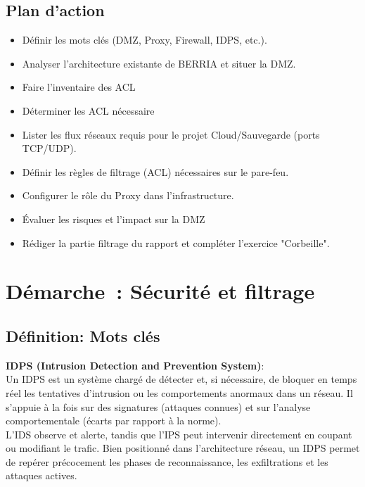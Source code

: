 \newpage

\subsection*{Plan d'action}
{}
\begin{itemize}
  \item Définir les mots clés (DMZ, Proxy, Firewall, IDPS, etc.).
  \item Analyser l'architecture existante de BERRIA et situer la DMZ.
  \item Faire l’inventaire des ACL
  \item Déterminer les ACL nécessaire
  \item Lister les flux réseaux requis pour le projet Cloud/Sauvegarde (ports TCP/UDP).
  \item Définir les règles de filtrage (ACL) nécessaires sur le pare-feu.
  \item Configurer le rôle du Proxy dans l'infrastructure.
  \item Évaluer les risques et l’impact sur la DMZ
  \item Rédiger la partie filtrage du rapport et compléter l'exercice "Corbeille".
\end{itemize}

\clearpage
\section*{Démarche~: Sécurité et filtrage }

\subsection*{Définition: Mots clés}
{}

\noindent \textbf{IDPS (Intrusion Detection and Prevention System)}:\\
Un IDPS est un système chargé de détecter et, si nécessaire, de bloquer en temps réel les tentatives d’intrusion ou les comportements anormaux dans un réseau. Il s’appuie à la fois sur des signatures (attaques connues) et sur l’analyse comportementale (écarts par rapport à la norme).\\
L’IDS observe et alerte, tandis que l’IPS peut intervenir directement en coupant ou modifiant le trafic. Bien positionné dans l’architecture réseau, un IDPS permet de repérer précocement les phases de reconnaissance, les exfiltrations et les attaques actives.

